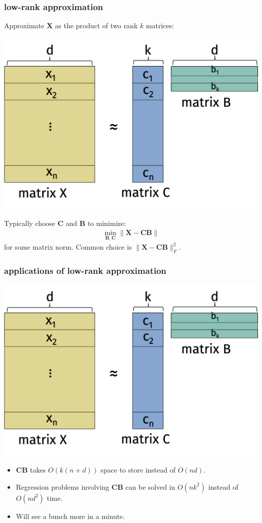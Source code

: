 \documentclass[compress]{beamer}
\newcommand{\bv}[1]{\mathbf{#1}}
\begin{document}
\begin{frame}
	\frametitle{low-rank approximation}
	Approximate $\bv{X}$ as the product of two rank $k$ matrices:
	\vspace{-1em}
	\begin{center}
		\includegraphics[width=.7\textwidth]{low-rank-basic.png}
	\end{center}
	\vspace{-.5em}
Typically choose $\bv{C}$ and $\bv{B}$ to minimize: 
\begin{align*}
	\min_{\bv{B},\bv{C}} \|\bv{X} - \bv{C}\bv{B}\|
\end{align*}
for some matrix norm. Common choice is $\|\bv{X} - \bv{C}\bv{B}\|_F^2$.
\end{frame}

\begin{frame}
	\frametitle{applications of low-rank approximation}
		\vspace{-1em}
	\begin{center}
		\includegraphics[width=.6\textwidth]{low-rank-basic.png}
	\end{center}
	\begin{itemize}
		\item $\bv{C} \bv{B}$ takes $O(k(n+d))$ space to store instead of $O(nd)$.
		\item Regression problems involving $\bv{C} \bv{B}$ can be solved in $O(nk^2)$ instead of $O(nd^2)$ time.
		\item Will see a bunch more in a minute.
	\end{itemize}
\end{frame}
\end{document}

